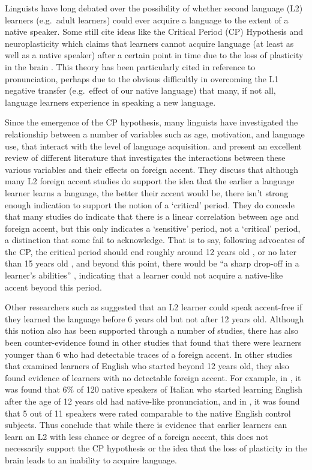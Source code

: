 \documentclass
[
    a4paper,
    twoside,
    12pt,
]
{report}
\begin{document}
Linguists have long debated over the possibility of whether second
language (L2) learners (e.g.~adult learners) could ever acquire a
language to the extent of a native speaker. Some still cite ideas like
the Critical Period (CP) Hypothesis and neuroplasticity which claims
that learners cannot acquire language (at least as well as a native
speaker) after a certain point in time due to the loss of plasticity in
the brain \parencite{lenneberg1967a,scovel1988a}. This theory has been
particularly cited in reference to pronunciation, perhaps due to the
obvious difficultly in overcoming the L1 negative transfer (e.g.~effect
of our native language) that many, if not all, language learners
experience in speaking a new language.

Since the emergence of the CP hypothesis, many linguists have
investigated the relationship between a number of variables such as age,
motivation, and language use, that interact with the level of language
acquisition. \textcite{piske2001} and \textcite{lengeris2012} present an
excellent review of different literature that investigates the
interactions between these various variables and their effects on
foreign accent. They discuss that although many L2 foreign accent
studies do support the idea that the earlier a language learner learns a
language, the better their accent would be, there isn't strong enough
indication to support the notion of a `critical' period. They do concede
that many studies do indicate that there is a linear correlation between
age and foreign accent, but this only indicates a `sensitive' period,
not a `critical' period, a distinction that some fail to acknowledge.
That is to say, following advocates of the CP, the critical period
should end roughly around 12 years old \parencite{scovel1988a}, or no
later than 15 years old \parencite{patkowski1990}, and beyond this
point, there would be ``a sharp drop-off in a learner's abilities''
\parencite{lengeris2012}, indicating that a learner could not acquire a
native-like accent beyond this period.

Other researchers such as \textcite{long1990} suggested that an L2
learner could speak accent-free if they learned the language before 6
years old but not after 12 years old. Although this notion also has been
supported through a number of studies, there has also been
counter-evidence found in other studies that found that there were
learners younger than 6 who had detectable traces of a foreign accent.
In other studies that examined learners of English who started beyond 12
years old, they also found evidence of learners with no detectable
foreign accent. For example, in \textcite{flege1995}, it was found that
6\% of 120 native speakers of Italian who started learning English after
the age of 12 years old had native-like pronunciation, and in
\textcite{bongaerts1995}, it was found that 5 out of 11 speakers were
rated comparable to the native English control subjects. Thus
\textcite{piske2001} conclude that while there is evidence that earlier
learners can learn an L2 with less chance or degree of a foreign accent,
this does not necessarily support the CP hypothesis or the idea that the
loss of plasticity in the brain leads to an inability to acquire
language.
\end{document}
